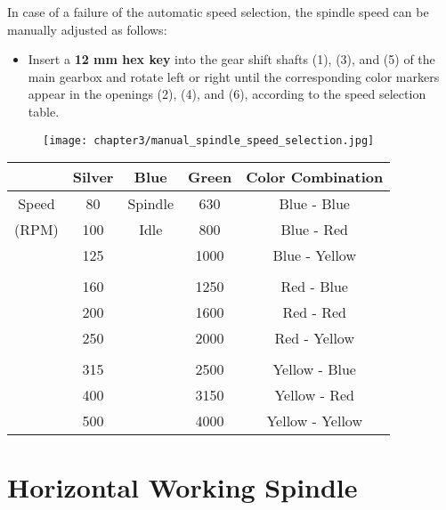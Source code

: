 In case of a failure of the automatic speed selection, the spindle speed can be manually adjusted as follows:

\begin{itemize}
    \item Insert a \textbf{12 mm hex key} into the gear shift shafts (1), (3), and (5) of the main gearbox and rotate left or right until the corresponding color markers appear in the openings (2), (4), and (6), according to the speed selection table.
\end{itemize}

\begin{figure}[h]
    \centering
    \texttt{[image: chapter3/manual\_spindle\_speed\_selection.jpg]}
    \label{fig:manual_spindle_speed_selection}
\end{figure}

\begin{table}[h]
    \centering
    \renewcommand{\arraystretch}{1.3}
    \begin{tabular}{|c|c|c|c|c|}
        \hline \hline
        \textbf{} & \textbf{Silver} & \textbf{Blue} & \textbf{Green} & \textbf{Color Combination} \\
        \hline \hline
        Speed   & 80    &   Spindle & 630  & Blue - Blue  \\
        (RPM)   & 100   &   Idle    & 800  & Blue - Red   \\
                & 125   &           & 1000 & Blue - Yellow \\
                &       &           &       &               \\
                & 160   &           & 1250 & Red - Blue  \\
                & 200   &           & 1600 & Red - Red   \\
                & 250   &           & 2000 & Red - Yellow \\
                &       &           &       &               \\
                & 315   &           & 2500 & Yellow - Blue \\
                & 400   &           & 3150 & Yellow - Red  \\
                & 500   &           & 4000 & Yellow - Yellow \\
        \hline \hline
    \end{tabular}
    \label{tab:spindle_speed}
\end{table}

\section{Horizontal Working Spindle}


